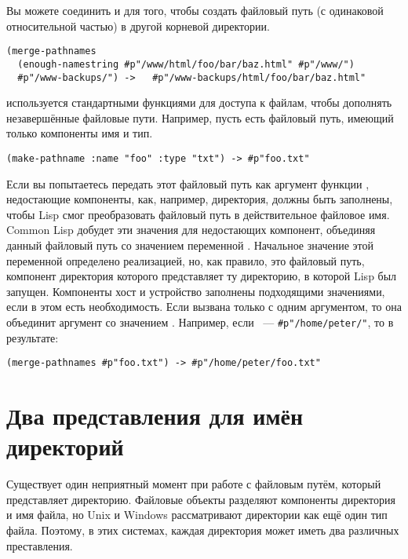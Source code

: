 Вы можете соединить  и  для того, чтобы
создать файловый путь (с одинаковой относительной частью) в другой корневой директории.

\begin{lstlisting}
(merge-pathnames 
  (enough-namestring #p"/www/html/foo/bar/baz.html" #p"/www/") 
  #p"/www-backups/") ->   #p"/www-backups/html/foo/bar/baz.html" 
\end{lstlisting}

 используется стандартными функциями для доступа к файлам, чтобы
дополнять незавершённые файловые пути. Например, пусть есть файловый путь, имеющий только
компоненты имя и тип.

\begin{lstlisting}
(make-pathname :name "foo" :type "txt") -> #p"foo.txt" 
\end{lstlisting}

Если вы попытаетесь передать этот файловый путь как аргумент функции ,
недостающие компоненты, как, например, директория, должны быть заполнены, чтобы Lisp смог
преобразовать файловый путь в действительное файловое имя. Common Lisp добудет эти
значения для недостающих компонент, объединяя данный файловый путь со значением переменной
. Начальное значение этой переменной определено
реализацией, но, как правило, это файловый путь, компонент директория которого
представляет ту директорию, в которой Lisp был запущен. Компоненты хост и устройство
заполнены подходящими значениями, если в этом есть необходимость. Если
 вызвана только с одним аргументом, то она объединит аргумент со
значением . Например, если
~--- \lstinline!#p"/home/peter/"!, то в результате:

\begin{lstlisting}
(merge-pathnames #p"foo.txt") -> #p"/home/peter/foo.txt" 
\end{lstlisting}

\section{Два представления для имён директорий}

Существует один неприятный момент при работе с файловым путём, который представляет
директорию. Файловые объекты разделяют компоненты директория и имя файла, но Unix и
Windows рассматривают директории как ещё один тип файла. Поэтому, в этих системах, каждая
директория может иметь два различных преставления.

